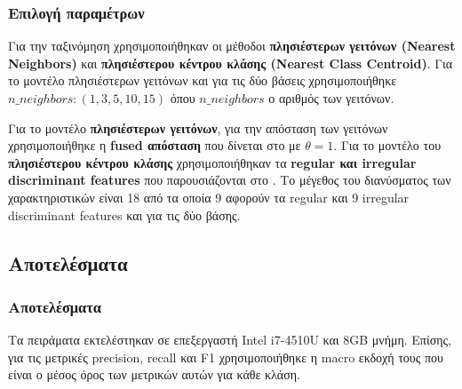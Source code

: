 \documentclass{beamer}
\begin{document}
\begin{frame}
\frametitle{Επιλογή παραμέτρων}

Για την ταξινόμηση χρησιμοποιήθηκαν οι μέθοδοι \textbf{πλησιέστερων γειτόνων
(Nearest Neighbors)} και \textbf{πλησιέστερου κέντρου κλάσης (Nearest Class
Centroid)}. Για το μοντέλο πλησιέστερων γειτόνων και για τις δύο βάσεις
χρησιμοποιήθηκε $n\_neighbors: (1, 3, 5, 10, 15)$ όπου $n\_neighbors$ ο αριθμός
των γειτόνων. \pause

Για το μοντέλο \textbf{πλησιέστερων γειτόνων}, για την απόσταση των γειτόνων
χρησιμοποιήθηκε η \textbf{fused απόσταση} που δίνεται στο \cite{kpca_lda} με
$\theta =1$.  Για το μοντέλο του \textbf{πλησιέστερου κέντρου κλάσης}
χρησιμοποιήθηκαν τα \textbf{regular και irregular discriminant features} που
παρουσιάζονται στο \cite{kpca_lda}. Το μέγεθος του διανύσματος των
χαρακτηριστικών είναι 18 από τα οποία 9 αφορούν τα regular και 9 irregular
discriminant features και για τις δύο βάσης.

\end{frame}

\subsection{Αποτελέσματα}

\begin{frame}
\frametitle{Αποτελέσματα}

Τα πειράματα εκτελέστηκαν σε επεξεργαστή Intel i7-4510U και 8GB μνήμη. Επίσης,
για τις μετρικές precision, recall και F1 χρησιμοποιήθηκε η macro εκδοχή τους
που είναι ο μέσος όρος των μετρικών αυτών για κάθε κλάση.

\end{frame}
\end{document}
